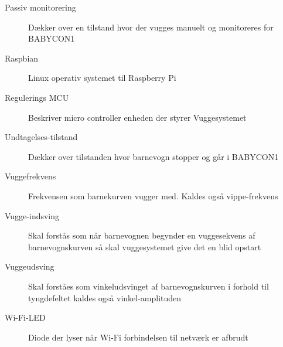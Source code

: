 \begin{description}
\item[Passiv monitorering] Dækker over en tilstand hvor der vugges manuelt og monitoreres for BABYCON1
\item[Raspbian] Linux operativ systemet til Raspberry Pi 
\item[Regulerings MCU] Beskriver micro controller enheden der styrer Vuggesystemet
\item[Undtagelses-tilstand] Dækker over tilstanden hvor barnevogn stopper og går i BABYCON1
\item[Vuggefrekvens] Frekvensen som barnekurven vugger med. Kaldes også vippe-frekvens
\item[Vugge-indsving] Skal forstås som når barnevognen begynder en vuggesekvens af barnevognskurven så skal vuggesystemet give det en blid opstart
\item[Vuggeudsving] Skal forståes som vinkeludsvinget af barnevognskurven i forhold til tyngdefeltet kaldes også vinkel-amplituden
\item[Wi-Fi-LED]Diode der lyser når Wi-Fi forbindelsen til netværk er afbrudt

\end{description}